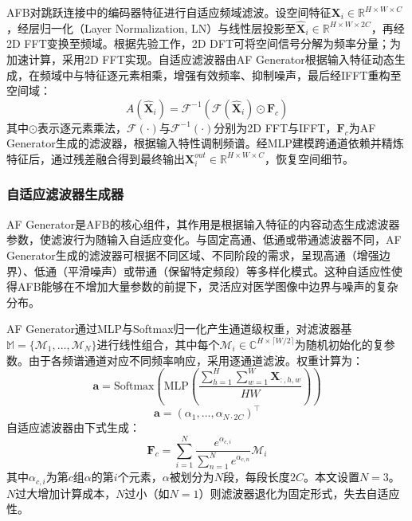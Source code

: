 \documentclass[12pt, a4paper, twoside]{article}
\begin{document}
AFB对跳跃连接中的编码器特征进行自适应频域滤波。设空间特征$\mathbf{X}_i \in \mathbb{R}^{H \times W \times C}$，经层归一化（Layer Normalization, LN）与线性层投影至$\hat{\mathbf{X}}_i \in \mathbb{R}^{H \times W \times 2C}$，再经2D FFT变换至频域。根据先验工作，2D DFT可将空间信号分解为频率分量；为加速计算，采用2D FFT实现。自适应滤波器由AF Generator根据输入特征动态生成，在频域中与特征逐元素相乘，增强有效频率、抑制噪声，最后经IFFT重构至空间域：
\begin{equation}
A(\hat{\mathbf{X}}_i) = \mathcal{F}^{-1}\left( \mathcal{F}(\hat{\mathbf{X}}_i) \odot \mathbf{F}_c \right)
\end{equation}
其中$\odot$表示逐元素乘法，$\mathcal{F}(\cdot)$与$\mathcal{F}^{-1}(\cdot)$分别为2D FFT与IFFT，$\mathbf{F}_c$为AF Generator生成的滤波器，根据输入特性调制频谱。经MLP建模跨通道依赖并精炼特征后，通过残差融合得到最终输出$\mathbf{X}_i^{out} \in \mathbb{R}^{H \times W \times C}$，恢复空间细节。

\subsubsection{自适应滤波器生成器}

AF Generator是AFB的核心组件，其作用是根据输入特征的内容动态生成滤波器参数，使滤波行为随输入自适应变化。与固定高通、低通或带通滤波器不同，AF Generator生成的滤波器可根据不同区域、不同阶段的需求，呈现高通（增强边界）、低通（平滑噪声）或带通（保留特定频段）等多样化模式。这种自适应性使得AFB能够在不增加大量参数的前提下，灵活应对医学图像中边界与噪声的复杂分布。

AF Generator通过MLP与Softmax归一化产生通道级权重，对滤波器基$\mathbb{M} = \{\mathcal{M}_1, \ldots, \mathcal{M}_N\}$进行线性组合，其中每个$\mathcal{M}_i \in \mathbb{C}^{H \times \lceil W/2 \rceil}$为随机初始化的复参数。由于各频谱通道对应不同频率响应，采用逐通道滤波。权重计算为：
\begin{equation}
\mathbf{a} = \text{Softmax}\left( \text{MLP}\left( \frac{\sum_{h=1}^{H}\sum_{w=1}^{W} \mathbf{X}_{:,h,w}}{HW} \right) \right)
\end{equation}
\begin{equation}
\mathbf{a} = (\alpha_1, \ldots, \alpha_{N \cdot 2C})^\top
\end{equation}
自适应滤波器由下式生成：
\begin{equation}
\mathbf{F}_c = \sum_{i=1}^{N} \frac{e^{\alpha_{c,i}}}{\sum_{n=1}^{N} e^{\alpha_{c,n}}} \mathcal{M}_i
\end{equation}
其中$\alpha_{c,i}$为第$c$组$\alpha$的第$i$个元素，$\alpha$被划分为$N$段，每段长度$2C$。本文设置$N=3$。$N$过大增加计算成本，$N$过小（如$N=1$）则滤波器退化为固定形式，失去自适应性。
\end{document}
